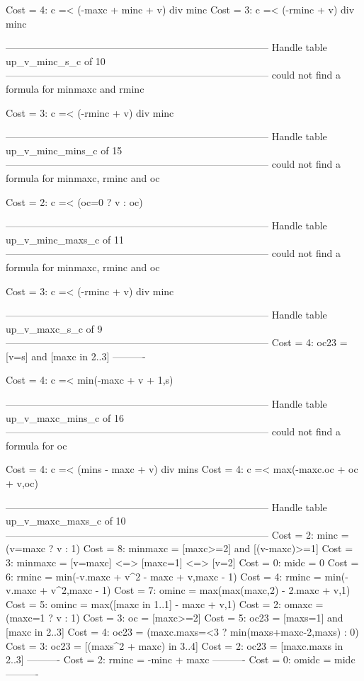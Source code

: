 Cost =  4:  c =< (-maxc + minc + v) div minc
Cost =  3:  c =< (-rminc + v) div minc

--------------------------------------------------------------------------------
Handle table up_v_minc_s_c of 10
--------------------------------------------------------------------------------
could not find a formula for minmaxc and rminc

Cost =  3:  c =< (-rminc + v) div minc

--------------------------------------------------------------------------------
Handle table up_v_minc_mins_c of 15
--------------------------------------------------------------------------------
could not find a formula for minmaxc, rminc and oc

Cost =  2:  c =< (oc=0 ? v : oc)

--------------------------------------------------------------------------------
Handle table up_v_minc_maxs_c of 11
--------------------------------------------------------------------------------
could not find a formula for minmaxc, rminc and oc

Cost =  3:  c =< (-rminc + v) div minc

--------------------------------------------------------------------------------
Handle table up_v_maxc_s_c of 9
--------------------------------------------------------------------------------
Cost =  4:  oc23 = [v=s] and [maxc in 2..3]
----------

Cost =  4:  c =< min(-maxc + v + 1,s)

--------------------------------------------------------------------------------
Handle table up_v_maxc_mins_c of 16
--------------------------------------------------------------------------------
could not find a formula for oc

Cost =  4:  c =< (mins - maxc + v) div mins
Cost =  4:  c =< max(-maxc.oc + oc + v,oc)

--------------------------------------------------------------------------------
Handle table up_v_maxc_maxs_c of 10
--------------------------------------------------------------------------------
Cost =  2:  minc    = (v=maxc ? v : 1)
Cost =  8:  minmaxc = [maxc>=2] and [(v-maxc)>=1]
Cost =  3:  minmaxc = [v=maxc] <=> [maxc=1] <=> [v=2]
Cost =  0:  midc    = 0
Cost =  6:  rminc   = min(-v.maxc + v^2 - maxc + v,maxc - 1)
Cost =  4:  rminc   = min(-v.maxc + v^2,maxc - 1)
Cost =  7:  ominc   = max(max(maxc,2) - 2.maxc + v,1)
Cost =  5:  ominc   = max([maxc in 1..1] - maxc + v,1)
Cost =  2:  omaxc   = (maxc=1 ? v : 1)
Cost =  3:  oc      = [maxc>=2]
Cost =  5:  oc23    = [maxs=1] and [maxc in 2..3]
Cost =  4:  oc23    = (maxc.maxs=<3 ? min(maxs+maxc-2,maxs) : 0)
Cost =  3:  oc23    = [(maxs^2 + maxc) in 3..4]
Cost =  2:  oc23    = [maxc.maxs in 2..3]
----------
Cost =  2:  rminc   = -minc + maxc
----------
Cost =  0:  omidc   = midc
----------

